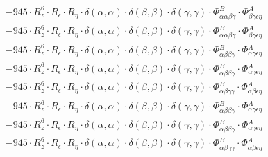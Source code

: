 \documentclass{article}
\begin{document}
\begin{subequations}
\begin{gather}
\begin{array}{c}
 \\[0.2em] 		 - 945 \cdot R_{z}^{6} \cdot R_{\epsilon{}} \cdot R_{\eta{}} \cdot \delta{}\left(\alpha{}, \alpha{}\right) \cdot \delta{}\left(\beta{}, \beta{}\right) \cdot \delta{}\left(\gamma{}, \gamma{}\right) \cdot \Phi{}^{B}_{\alpha{}\alpha{}\beta{}\gamma{}} \cdot \Phi{}^{A}_{\beta{}\gamma{}\epsilon{}\eta{}} 
 \\[0.2em] 		 - 945 \cdot R_{z}^{6} \cdot R_{\epsilon{}} \cdot R_{\eta{}} \cdot \delta{}\left(\alpha{}, \alpha{}\right) \cdot \delta{}\left(\beta{}, \beta{}\right) \cdot \delta{}\left(\gamma{}, \gamma{}\right) \cdot \Phi{}^{B}_{\alpha{}\alpha{}\beta{}\gamma{}} \cdot \Phi{}^{A}_{\beta{}\gamma{}\epsilon{}\eta{}} 
 \\[0.2em] 		 - 945 \cdot R_{z}^{6} \cdot R_{\epsilon{}} \cdot R_{\eta{}} \cdot \delta{}\left(\alpha{}, \alpha{}\right) \cdot \delta{}\left(\beta{}, \beta{}\right) \cdot \delta{}\left(\gamma{}, \gamma{}\right) \cdot \Phi{}^{B}_{\alpha{}\beta{}\beta{}\gamma{}} \cdot \Phi{}^{A}_{\alpha{}\gamma{}\epsilon{}\eta{}} 
 \\[0.2em] 		 - 945 \cdot R_{z}^{6} \cdot R_{\epsilon{}} \cdot R_{\eta{}} \cdot \delta{}\left(\alpha{}, \alpha{}\right) \cdot \delta{}\left(\beta{}, \beta{}\right) \cdot \delta{}\left(\gamma{}, \gamma{}\right) \cdot \Phi{}^{B}_{\alpha{}\beta{}\beta{}\gamma{}} \cdot \Phi{}^{A}_{\alpha{}\gamma{}\epsilon{}\eta{}} 
 \\[0.2em] 		 - 945 \cdot R_{z}^{6} \cdot R_{\epsilon{}} \cdot R_{\eta{}} \cdot \delta{}\left(\alpha{}, \alpha{}\right) \cdot \delta{}\left(\beta{}, \beta{}\right) \cdot \delta{}\left(\gamma{}, \gamma{}\right) \cdot \Phi{}^{B}_{\alpha{}\beta{}\gamma{}\gamma{}} \cdot \Phi{}^{A}_{\alpha{}\beta{}\epsilon{}\eta{}} 
 \\[0.2em] 		 - 945 \cdot R_{z}^{6} \cdot R_{\epsilon{}} \cdot R_{\eta{}} \cdot \delta{}\left(\alpha{}, \alpha{}\right) \cdot \delta{}\left(\beta{}, \beta{}\right) \cdot \delta{}\left(\gamma{}, \gamma{}\right) \cdot \Phi{}^{B}_{\alpha{}\beta{}\beta{}\gamma{}} \cdot \Phi{}^{A}_{\alpha{}\gamma{}\epsilon{}\eta{}} 
 \\[0.2em] 		 - 945 \cdot R_{z}^{6} \cdot R_{\epsilon{}} \cdot R_{\eta{}} \cdot \delta{}\left(\alpha{}, \alpha{}\right) \cdot \delta{}\left(\beta{}, \beta{}\right) \cdot \delta{}\left(\gamma{}, \gamma{}\right) \cdot \Phi{}^{B}_{\alpha{}\beta{}\beta{}\gamma{}} \cdot \Phi{}^{A}_{\alpha{}\gamma{}\epsilon{}\eta{}} 
 \\[0.2em] 		 - 945 \cdot R_{z}^{6} \cdot R_{\epsilon{}} \cdot R_{\eta{}} \cdot \delta{}\left(\alpha{}, \alpha{}\right) \cdot \delta{}\left(\beta{}, \beta{}\right) \cdot \delta{}\left(\gamma{}, \gamma{}\right) \cdot \Phi{}^{B}_{\alpha{}\beta{}\gamma{}\gamma{}} \cdot \Phi{}^{A}_{\alpha{}\beta{}\epsilon{}\eta{}} 

\end{array}
\end{gather}
\end{subequations}
\end{document}
